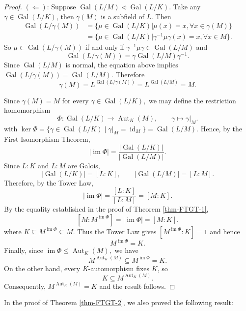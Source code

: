 \begin{proof}
    $(\Leftarrow)$: Suppose $\operatorname{Gal}(L /M)\lhd \operatorname{Gal}(L /K)$. Take any $\gamma\in \operatorname{Gal}(L /K)$, then $\gamma(M)$ is a subfield of $L$. Then 
    \[
    \begin{aligned}
        \operatorname{Gal}(L/ \gamma(M))&=\{\mu\in \operatorname{Gal}(L /K)|\mu(x)=x,\forall x\in \gamma(M)\}\\
        &=\{\mu\in \operatorname{Gal}(L /K)|\gamma^{-1}\mu\gamma(x)=x,\forall x\in M\}.
    \end{aligned}
    \]
    So $\mu\in \operatorname{Gal}(L /\gamma(M))$ if and only if $\gamma^{-1}\mu\gamma\in \operatorname{Gal}(L /M)$ and 
    \[
    \operatorname{Gal}(L /\gamma(M))=\gamma\operatorname{Gal}(L /M)\gamma^{-1}. 
    \]
    Since $\operatorname{Gal}(L /M)$ is normal, the equation above implies $\operatorname{Gal}(L /\gamma(M))=\operatorname{Gal}(L /M)$. Therefore 
    \[
    \gamma(M)=L^{\operatorname{Gal}(L /\gamma(M))}=L^{\operatorname{Gal}(L /M)}=M. 
    \]

Since \(
\gamma(M)=M
\) for every \(\gamma\in \operatorname{Gal}(L/K),\) we may define the restriction homomorphism
\[
\Phi:\operatorname{Gal}(L/K)\longrightarrow \operatorname{Aut}_K(M),
\qquad
\gamma\longmapsto \gamma|_M.
\]
with \(\ker\Phi
=
\{\gamma\in\operatorname{Gal}(L/K)\mid \gamma|_M=\operatorname{id}_M\}
=
\operatorname{Gal}(L/M).
\) Hence, by the First Isomorphism Theorem,
\[
|\operatorname{im}\Phi|
=
\frac{|\operatorname{Gal}(L/K)|}
     {|\operatorname{Gal}(L/M)|}.
\]
Since $L:K$ and $L:M$ are Galois,
\[
|\operatorname{Gal}(L/K)|=[L:K],
\qquad
|\operatorname{Gal}(L/M)|=[L:M].
\]
Therefore, by the Tower Law,
\[
|\operatorname{im}\Phi|
=
\frac{[L:K]}{[L:M]}
=
[M:K].
\]
By the equality established in the proof of Theorem \ref{thm-FTGT-1},
\[
[M:M^{\operatorname{im}\Phi}]=|{\operatorname{im}\Phi}|=[M:K].
\]
where \(
K\subseteq M^{\operatorname{im}\Phi}\subseteq M.
\)
Thus the Tower Law gives \(
[M^{\operatorname{im}\Phi}:K]=1
\)
and hence
\[
M^{\operatorname{im}\Phi}=K.
\]
Finally, since
\(
{\operatorname{im}\Phi}\leq \operatorname{Aut}_K(M),
\)
we have
\[
M^{\operatorname{Aut}_K(M)}
\subseteq M^{\operatorname{im}\Phi}=K.
\]
On the other hand, every $K$-automorphism fixes $K$, so
\[
K\subseteq M^{\operatorname{Aut}_K(M)}.
\]
Consequently,
\(
M^{\operatorname{Aut}_K(M)}=K
\)
and the result follows.
\end{proof}

\begin{remark}\label{rmk-GaloisExtensionEquiFixedField}
    In the proof of Theorem \ref{thm-FTGT-2}, we also proved the following result: 
    \begin{center}
    \end{center}
\end{remark}
